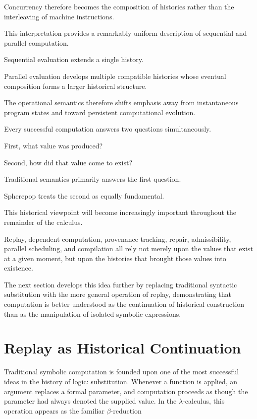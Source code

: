 \documentclass[12pt,oneside]{article}
\theoremstyle{definition}
\theoremstyle{remark}
\begin{document}
Concurrency therefore becomes the composition of histories rather than the
interleaving of machine instructions.

This interpretation provides a remarkably uniform description of sequential and
parallel computation.

Sequential evaluation extends a single history.

Parallel evaluation develops multiple compatible histories whose eventual
composition forms a larger historical structure.

The operational semantics therefore shifts emphasis away from instantaneous
program states and toward persistent computational evolution.

Every successful computation answers two questions simultaneously.

First, what value was produced?

Second, how did that value come to exist?

Traditional semantics primarily answers the first question.

Spherepop treats the second as equally fundamental.

This historical viewpoint will become increasingly important throughout the
remainder of the calculus.

Replay, dependent computation, provenance tracking, repair, admissibility,
parallel scheduling, and compilation all rely not merely upon the values that
exist at a given moment, but upon the histories that brought those values into
existence.

The next section develops this idea further by replacing traditional syntactic
substitution with the more general operation of replay, demonstrating that
computation is better understood as the continuation of historical
construction than as the manipulation of isolated symbolic expressions.

\section{Replay as Historical Continuation}

Traditional symbolic computation is founded upon one of the most successful
ideas in the history of logic: substitution. Whenever a function is applied,
an argument replaces a formal parameter, and computation proceeds as though the
parameter had always denoted the supplied value. In the $\lambda$-calculus,
this operation appears as the familiar $\beta$-reduction
\end{document}
